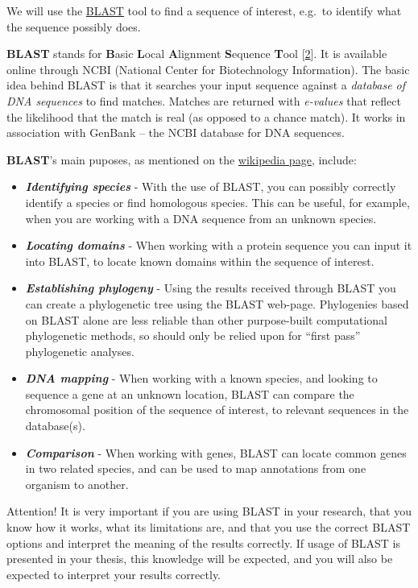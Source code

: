 \documentclass[]{article}
\begin{document}
We will use the \href{http://blast.ncbi.nlm.nih.gov/}{BLAST} tool to
find a sequence of interest, e.g.~to identify what the sequence possibly
does.

\textbf{BLAST} stands for \textbf{B}asic \textbf{L}ocal
\textbf{A}lignment \textbf{S}equence \textbf{T}ool
{[}\href{http://www.ncbi.nlm.nih.gov/pubmed/?term=9254694}{2}{]}. It is
available online through NCBI (National Center for Biotechnology
Information). The basic idea behind BLAST is that it searches your input
sequence against a \emph{database of DNA sequences} to find matches.
Matches are returned with \emph{e-values} that reflect the likelihood
that the match is real (as opposed to a chance match). It works in
association with GenBank -- the NCBI database for DNA sequences.

\textbf{BLAST}'s main puposes, as mentioned on the
\href{https://en.wikipedia.org/wiki/BLAST}{wikipedia page}, include:

\begin{itemize}
\itemsep1pt\parskip0pt
\item
  \emph{\textbf{Identifying species}} - With the use of BLAST, you can
  possibly correctly identify a species or find homologous species. This
  can be useful, for example, when you are working with a DNA sequence
  from an unknown species.
\item
  \emph{\textbf{Locating domains}} - When working with a protein
  sequence you can input it into BLAST, to locate known domains within
  the sequence of interest.
\item
  \emph{\textbf{Establishing phylogeny}} - Using the results received
  through BLAST you can create a phylogenetic tree using the BLAST
  web-page. Phylogenies based on BLAST alone are less reliable than
  other purpose-built computational phylogenetic methods, so should only
  be relied upon for ``first pass'' phylogenetic analyses.
\item
  \emph{\textbf{DNA mapping}} - When working with a known species, and
  looking to sequence a gene at an unknown location, BLAST can compare
  the chromosomal position of the sequence of interest, to relevant
  sequences in the database(s).
\item
  \emph{\textbf{Comparison}} - When working with genes, BLAST can locate
  common genes in two related species, and can be used to map
  annotations from one organism to another.
\end{itemize}

Attention! It is very important if you are using BLAST in your research,
that you know how it works, what its limitations are, and that you use
the correct BLAST options and interpret the meaning of the results
correctly. If usage of BLAST is presented in your thesis, this knowledge
will be expected, and you will also be expected to interpret your
results correctly.
\end{document}
